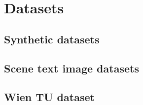 \chapter{Datasets}

\section{Synthetic datasets}
\section{Scene text image datasets}
\section{Wien TU dataset}

